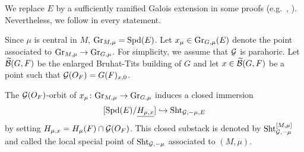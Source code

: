 \documentclass[12pt,reqno]{amsart}
\begin{document}
\begin{rmk}
    We replace $E$ by a sufficiently ramified Galois extension in some proofs (e.g.\ , ). Nevertheless, we follow  in every statement. 
\end{rmk}

Since $\mu$ is central in $M$, ${\operatorname{Gr}}_{M, \mu} = {\operatorname{Spd}}(E)$. Let $x_\mu \in {\operatorname{Gr}}_{G, \mu}(E)$ denote the point associated to ${\operatorname{Gr}}_{M, \mu} \to {\operatorname{Gr}}_{G, \mu}$. For simplicity, we assume that ${\mathcal{G}}$ is parahoric. Let ${\mathcal{{\widetilde{B}}}}(G, F)$ be the enlarged Bruhat-Tits building of $G$ and let $x \in {\mathcal{{\widetilde{B}}}}(G, F)$ be a point such that ${\mathcal{G}}(O_F) = G(F)_{x, 0}$. 


\begin{lem} \label{lem:level_structure_special_points}
    The ${\mathcal{G}}(O_F)$-orbit of $x_\mu\colon {\operatorname{Gr}}_{M, \mu} \to {\operatorname{Gr}}_{G, \mu}$ induces a closed immersion
    \[
        [{\operatorname{Spd}}(E) / {\underline{H_{\mu, x}}}] \hookrightarrow  {\operatorname{Sht}}_{{\mathcal{G}}, -\mu, E}
    \]
    by setting $H_{\mu, x} = H_\mu(F) \cap {\mathcal{G}}(O_F)$. This closed substack is denoted by ${\operatorname{Sht}}_{{\mathcal{G}}, -\mu}^{[M, \mu]}$ and called the \textup{local special point} of ${\operatorname{Sht}}_{{\mathcal{G}}, -\mu}$ associated to $(M, \mu)$. 
\end{lem}
\end{document}

